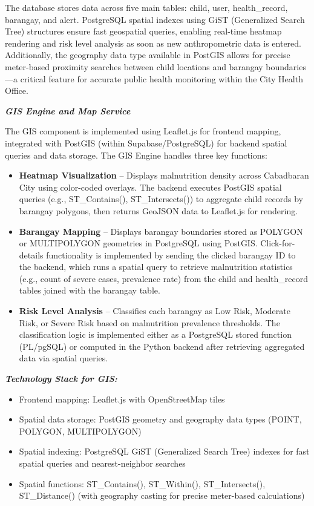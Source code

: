 \documentclass[12pt, a4paper]{report}
\begin{document}
The database stores data across five main tables: child, user, health\_record, barangay, and alert. PostgreSQL spatial indexes using GiST (Generalized Search Tree) structures ensure fast geospatial queries, enabling real-time heatmap rendering and risk level analysis as soon as new anthropometric data is entered. Additionally, the geography data type available in PostGIS allows for precise meter-based proximity searches between child locations and barangay boundaries---a critical feature for accurate public health monitoring within the City Health Office.

\noindent \textbf{\textit{GIS Engine and Map Service}}

The GIS component is implemented using Leaflet.js for frontend mapping, integrated with PostGIS (within Supabase/PostgreSQL) for backend spatial queries and data storage. The GIS Engine handles three key functions:

\begin{itemize}
    \item \textbf{Heatmap Visualization} -- Displays malnutrition density across Cabadbaran City using color-coded overlays. The backend executes PostGIS spatial queries (e.g., ST\_Contains(), ST\_Intersects()) to aggregate child records by barangay polygons, then returns GeoJSON data to Leaflet.js for rendering.
    \item \textbf{Barangay Mapping} -- Displays barangay boundaries stored as POLYGON or MULTIPOLYGON geometries in PostgreSQL using PostGIS. Click-for-details functionality is implemented by sending the clicked barangay ID to the backend, which runs a spatial query to retrieve malnutrition statistics (e.g., count of severe cases, prevalence rate) from the child and health\_record tables joined with the barangay table.
    \item \textbf{Risk Level Analysis} -- Classifies each barangay as Low Risk, Moderate Risk, or Severe Risk based on malnutrition prevalence thresholds. The classification logic is implemented either as a PostgreSQL stored function (PL/pgSQL) or computed in the Python backend after retrieving aggregated data via spatial queries.
\end{itemize}

\noindent \textbf{\textit{Technology Stack for GIS:}}

\begin{itemize}
    \item Frontend mapping: Leaflet.js with OpenStreetMap tiles
    \item Spatial data storage: PostGIS geometry and geography data types (POINT, POLYGON, MULTIPOLYGON)
    \item Spatial indexing: PostgreSQL GiST (Generalized Search Tree) indexes for fast spatial queries and nearest-neighbor searches
    \item Spatial functions: ST\_Contains(), ST\_Within(), ST\_Intersects(), ST\_Distance() (with geography casting for precise meter-based calculations)
\end{itemize}
\end{document}
